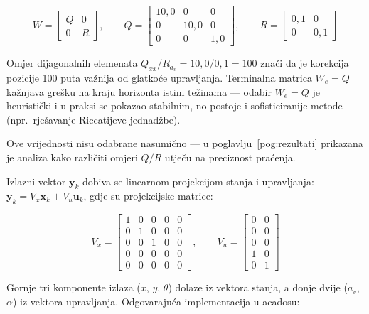 \begin{equation}
  W = \begin{bmatrix} Q & 0 \\ 0 & R \end{bmatrix}, \qquad
  Q = \begin{bmatrix} 10{,}0 & 0 & 0 \\ 0 & 10{,}0 & 0 \\ 0 & 0 & 1{,}0 \end{bmatrix}, \qquad
  R = \begin{bmatrix} 0{,}1 & 0 \\ 0 & 0{,}1 \end{bmatrix}
\end{equation}

Omjer dijagonalnih elemenata $Q_{xx} / R_{a_v} = 10{,}0 / 0{,}1 = 100$ znači da je korekcija pozicije 100 puta važnija od glatkoće upravljanja. Terminalna matrica $W_e = Q$ kažnjava grešku na kraju horizonta istim težinama --- odabir $W_e = Q$ je heuristički i u praksi se pokazao stabilnim, no postoje i sofisticiranije metode (npr.\ rješavanje Riccatijeve jednadžbe).

Ove vrijednosti nisu odabrane nasumično --- u poglavlju~\ref{pog:rezultati} prikazana je analiza kako različiti omjeri $Q/R$ utječu na preciznost praćenja.

Izlazni vektor $\mathbf{y}_k$ dobiva se linearnom projekcijom stanja i upravljanja: $\mathbf{y}_k = V_x \mathbf{x}_k + V_u \mathbf{u}_k$, gdje su projekcijske matrice:

\begin{equation}
  V_x = \begin{bmatrix}
    1 & 0 & 0 & 0 & 0 \\
    0 & 1 & 0 & 0 & 0 \\
    0 & 0 & 1 & 0 & 0 \\
    0 & 0 & 0 & 0 & 0 \\
    0 & 0 & 0 & 0 & 0
  \end{bmatrix}, \qquad
  V_u = \begin{bmatrix}
    0 & 0 \\
    0 & 0 \\
    0 & 0 \\
    1 & 0 \\
    0 & 1
  \end{bmatrix}
\end{equation}

Gornje tri komponente izlaza ($x$, $y$, $\theta$) dolaze iz vektora stanja, a donje dvije ($a_v$, $\alpha$) iz vektora upravljanja. Odgovarajuća implementacija u acadosu:

